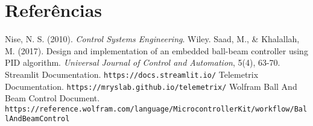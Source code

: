 \documentclass[a4paper, 11pt]{article}
\begin{document}
\section{Referências}
\begin{thebibliography}{9}
     Nise, N. S. (2010). \textit{Control Systems Engineering}. Wiley.
     Saad, M., & Khalallah, M. (2017). Design and implementation of an embedded ball-beam controller using PID algorithm. \textit{Universal Journal of Control and Automation}, 5(4), 63-70.
     Streamlit Documentation. \texttt{https://docs.streamlit.io/}
     Telemetrix Documentation. \texttt{https://mryslab.github.io/telemetrix/}
     Wolfram Ball And Beam Control Document. \texttt{https://reference.wolfram.com/language/MicrocontrollerKit/workflow/BallAndBeamControl}
\end{thebibliography}
\end{document}
